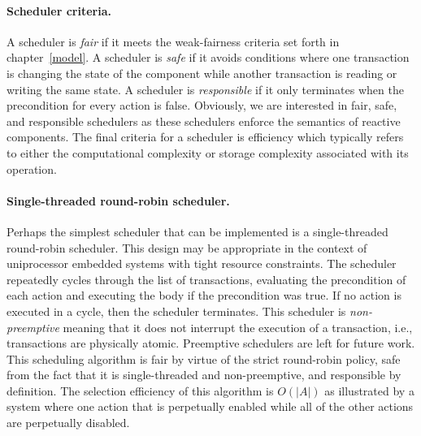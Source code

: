 \paragraph{Scheduler criteria.}
A scheduler is \emph{fair} if it meets the weak-fairness criteria set forth in chapter~\ref{model}.
A scheduler is \emph{safe} if it avoids conditions where one transaction is changing the state of the component while another transaction is reading or writing the same state.
A scheduler is \emph{responsible} if it only terminates when the precondition for every action is false.
Obviously, we are interested in fair, safe, and responsible schedulers as these schedulers enforce the semantics of reactive components.
The final criteria for a scheduler is efficiency which typically refers to either the computational complexity or storage complexity associated with its operation.

\paragraph{Single-threaded round-robin scheduler.}
Perhaps the simplest scheduler that can be implemented is a single-threaded round-robin scheduler.
This design may be appropriate in the context of uniprocessor embedded systems with tight resource constraints.
The scheduler repeatedly cycles through the list of transactions, evaluating the precondition of each action and executing the body if the precondition was true.
If no action is executed in a cycle, then the scheduler terminates.
This scheduler is \emph{non-preemptive} meaning that it does not interrupt the execution of a transaction, i.e., transactions are physically atomic.
Preemptive schedulers are left for future work.
This scheduling algorithm is fair by virtue of the strict round-robin policy, safe from the fact that it is single-threaded and non-preemptive, and responsible by definition.
The selection efficiency of this algorithm is $O(|A|)$ as illustrated by a system where one action that is perpetually enabled while all of the other actions are perpetually disabled.


